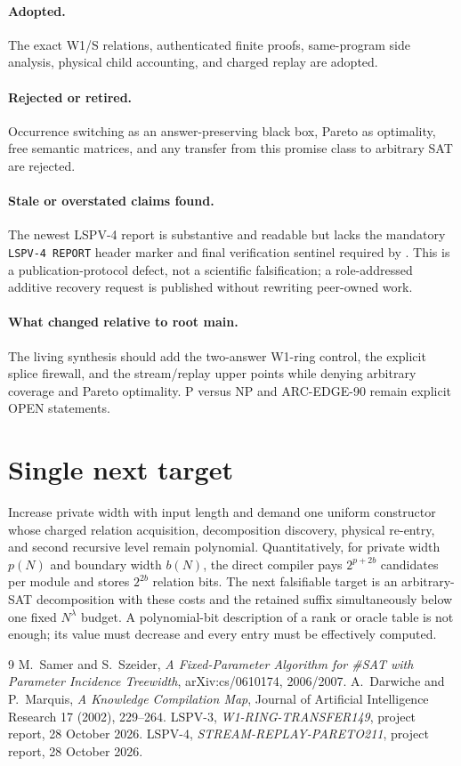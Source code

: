 \documentclass[11pt]{article}
\begin{document}
\paragraph{Adopted.}
The exact W1/S relations, authenticated finite proofs, same-program side
analysis, physical child accounting, and charged replay are adopted.
\paragraph{Rejected or retired.}
Occurrence switching as an answer-preserving black box, Pareto as optimality,
free semantic matrices, and any transfer from this promise class to arbitrary
SAT are rejected.
\paragraph{Stale or overstated claims found.}
The newest LSPV-4 report is substantive and readable but lacks the mandatory
\texttt{LSPV-4 REPORT} header marker and final verification sentinel required
by . This is a publication-protocol defect, not a scientific
falsification; a role-addressed additive recovery request is published without
rewriting peer-owned work.
\paragraph{What changed relative to root main.}
The living synthesis should add the two-answer W1-ring control, the explicit
splice firewall, and the stream/replay upper points while denying arbitrary
coverage and Pareto optimality. P versus NP and ARC-EDGE-90 remain explicit
OPEN statements.

\section{Single next target}
Increase private width with input length and demand one uniform constructor
whose charged relation acquisition, decomposition discovery, physical
re-entry, and second recursive level remain polynomial. Quantitatively, for
private width $p(N)$ and boundary width $b(N)$, the direct compiler pays
$2^{p+2b}$ candidates per module and stores $2^{2b}$ relation bits. The next
falsifiable target is an arbitrary-SAT decomposition with these costs and the
retained suffix simultaneously below one fixed $N^\lambda$ budget. A
polynomial-bit description of a rank or oracle table is not enough; its value
must decrease and every entry must be effectively computed.

\begin{thebibliography}{9}
 M.~Samer and S.~Szeider,
\emph{A Fixed-Parameter Algorithm for \#SAT with Parameter Incidence
Treewidth}, arXiv:cs/0610174, 2006/2007.
 A.~Darwiche and P.~Marquis,
\emph{A Knowledge Compilation Map},
Journal of Artificial Intelligence Research 17 (2002), 229--264.
 LSPV-3, \emph{W1-RING-TRANSFER149}, project report,
28 October 2026.
 LSPV-4, \emph{STREAM-REPLAY-PARETO211}, project report,
28 October 2026.
\end{thebibliography}

\end{document}
